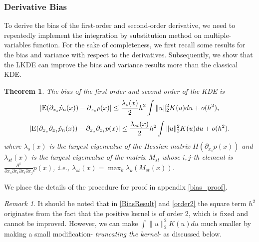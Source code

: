\documentclass[aos,preprint]{imsart}
\newtheorem{theorem}{Theorem}[section]
\theoremstyle{remark}
\newtheorem*{remark}{Remark}
\begin{document}
\subsubsection{Derivative Bias}
To derive the bias of the first-order and second-order derivative, we need to repeatedly implement the integration by substitution method on multiple-variables function. For the sake of completeness, we first recall some results for the bias and variance with respect to the derivatives. Subsequently, we show that the LKDE can improve the bias and variance results more than the classical KDE.

\begin{theorem}
The bias of the first order and second order of the KDE is 
\begin{equation*}\label{BiasResult}
|{\rm E}(\partial_{x_s}  \hat{p}_n(x)) - \partial_{x_s}p(x)|  \leq \frac{\lambda_s(x)}{2} h^2 \int \|u\|_2^2 K(u) du+o(h^2),
\end{equation*}
\begin{equation*}\label{order2}
|{\rm E}( \partial_{x_s} \partial_{x_t}  \hat{p}_n(x)) -  \partial_{x_s} \partial_{x_t} p(x)| \leq \frac{\lambda_{st}(x)}{2} h^2 \int \|u\|_2^2 K(u) du+o(h^2).
\end{equation*}
where $\lambda_s(x)$ is the largest eigenvalue of the Hessian matrix $H(\partial_{x_s}p(x))$ and $\lambda_{st}(x)$ is the largest eigenvalue of the matrix $M_{st}$ whose $i,j$-th element is $\frac{\partial^4}{\partial x_s\partial x_t \partial x_i \partial x_j} p(x)$, i.e., $\lambda_{st}(x)= \max_k \lambda_k( M_{st}(x))$.
\end{theorem}
We place the details of the procedure for proof in appendix \ref{bias_proof}.
\begin{remark}
It should be noted that in \eqref{BiasResult} and \eqref{order2} the square term $h^2$ originates from the fact that the positive kernel is of order 2, which is fixed and cannot be improved. However, we can make $\int \|u\|_2^2 K(u)du$ much smaller by making a small modification- {\it truncating the kernel}- as discussed below.
\end{remark}
\end{document}
